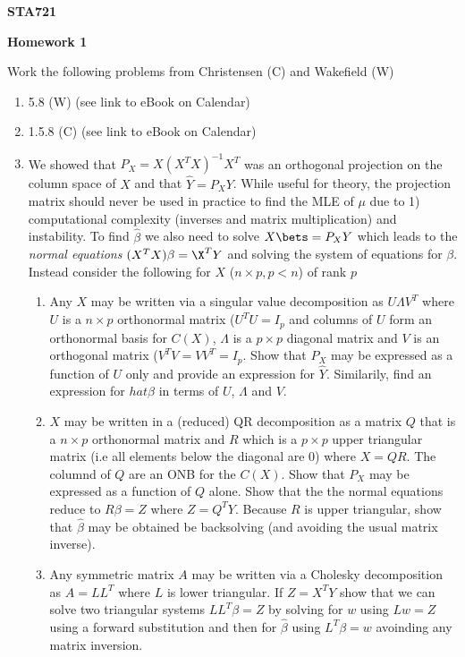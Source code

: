 \documentclass[12pt]{article}
\begin{document}
{\bf STA721}
\vspace{.1in}
\begin{center}
{\large \bf Homework 1} \\
\end{center}
\vspace{.5in}
\noindent
Work the following problems from Christensen (C) and Wakefield (W)
\begin{enumerate}
\item 5.8 (W)  (see link to eBook on Calendar)
\item 1.5.8 (C) (see link to eBook on Calendar)

\item We showed that $P_X = X(X^TX)^{-1}X^T$ was an orthogonal
  projection on the column space of $X$ and that $\hat{Y} = P_X Y$.
  While useful for theory, the projection matrix should never be used
  in practice to find the MLE of $\mu$ due to 1) computational
  complexity (inverses and matrix multiplication) and instability.  To
  find $\hat{\beta}$ we also need to solve $X \bets = P_X Y $ which
  leads to the {\it normal equations}  $(X^TX) \beta = \X^TY$ and
  solving the system of equations for $\beta$.
  Instead consider the following for $X$ ($n \times p, p < n$) of rank $p$

  \begin{enumerate}
  \item Any $X$ may be written via a singular value decomposition as $U
    \Lambda V^T$ where $U$ is a $n \times p$ orthonormal matrix ($U^TU
    = I_p$ and columns of $U$ form an orthonormal basis for $C(X)$, 
    $\Lambda$ is a $p \times p$ diagonal matrix and $V$ is an
    orthogonal matrix ($V^TV = V V^T = I_p$.   Show that $P_X$ may be
    expressed as a function of $U$ only and provide an expression for
    $\hat{Y}$.
    Similarily, find an expression for $hat{\beta}$ in terms of $U$,
    $\Lambda$ and $V$.  
\item $X$ may be written in a (reduced) QR decomposition as a matrix
  $Q$ that is a $n \times p$ orthonormal matrix and $R$ which is a $p
  \times p$ upper triangular matrix (i.e all elements below the
  diagonal are 0) where $X = Q R$. The columnd of $Q$ are an ONB for
  the $C(X)$. Show that $P_X$
  may be expressed as a function of $Q$ alone.   Show that  the 
 the normal equations reduce to $R \beta = Z$ where $Z = Q^T Y$.
 Because $R$ is upper triangular, show that $\hat{\beta}$ may be
 obtained be backsolving (and avoiding the usual matrix inverse).   
\item Any symmetric matrix $A$ may be written via a Cholesky
  decomposition as $A = L L^T$ where $L$
  is lower triangular.   If $Z = X^TY$  show that we can solve two
  triangular systems $L L^T \beta = Z$ by solving for $w$ using  $L w = Z$ using a
  forward substitution and then for $\hat{\beta}$ using $L^T \beta =
  w$ avoinding any matrix inversion.


\end{enumerate}
\end{enumerate}
\end{document}
